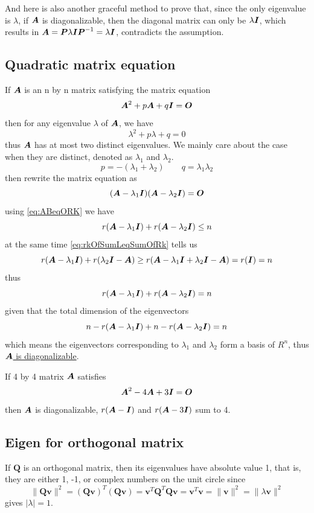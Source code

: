 \documentclass{overview}
\begin{document}
And here is also another graceful method to prove that, since the only eigenvalue
is $\lambda$, if $\boldsymbol{A}$ is diagonalizable, then the diagonal matrix can only be
$\lambda \boldsymbol{I}$, which results in $\boldsymbol{A} = \boldsymbol{P} \lambda \boldsymbol{I} \boldsymbol{P}^{-1} = \lambda \boldsymbol{I}$, contradicts the assumption.

\subsection{Quadratic matrix equation}

If $\boldsymbol{A}$ is an n by n matrix satisfying the matrix equation
\[
	\boldsymbol{A}^{2} + p\boldsymbol{A} + q\boldsymbol{I} = \boldsymbol{O}
\] 
then for any eigenvalue $\lambda$ of $\boldsymbol{A}$, we have
\[
	\lambda^{2} + p\lambda + q = 0
\]
thus $\boldsymbol{A}$ has at most two distinct eigenvalues. We mainly care about the case
when they are distinct, denoted as $\lambda_1$ and $\lambda_2$.
\[
p=-(\lambda_1 + \lambda_2) \quad  \quad q=\lambda_1 \lambda_2
\] 
then rewrite the matrix equation as
\[
	(\boldsymbol{A} - \lambda_1 \boldsymbol{I})(\boldsymbol{A} - \lambda_2 \boldsymbol{I}) = \boldsymbol{O}
\]
using \eqref{eq:ABeqORK} we have
\[
	r(\boldsymbol{A} - \lambda_1 \boldsymbol{I}) + r(\boldsymbol{A} - \lambda_2 \boldsymbol{I}) \leq n
\] 
at the same time \eqref{eq:rkOfSumLeqSumOfRk} tells us
\[
	r(\boldsymbol{A} - \lambda_1 \boldsymbol{I})+r(\lambda_2 \boldsymbol{I} - \boldsymbol{A}) \geq 
	r(\boldsymbol{A} - \lambda_1\boldsymbol{I} + \lambda_2 \boldsymbol{I} - \boldsymbol{A}) = r(\boldsymbol{I}) = n
\] 
thus
\begin{equation}
	r(\boldsymbol{A} - \lambda_1 \boldsymbol{I}) + r(\boldsymbol{A} - \lambda_2 \boldsymbol{I}) = n
\end{equation}
given that the total dimension of the eigenvectors
\[
 	n-r(\boldsymbol{A} - \lambda_1 \boldsymbol{I}) + n - r(\boldsymbol{A} - \lambda_2 \boldsymbol{I}) = n
\] 
which means the eigenvectors corresponding to $\lambda_1$ and $\lambda_2$
form a basis of $R^{n}$, thus \underline{$\boldsymbol{A}$ is diagonalizable}.

\begin{example}
If 4 by 4 matrix $\boldsymbol{A}$ satisfies
\[
	\boldsymbol{A}^{2} - 4\boldsymbol{A} + 3\boldsymbol{I} = \boldsymbol{O}
\] 
then $\boldsymbol{A}$ is diagonalizable, $r(\boldsymbol{A} - \boldsymbol{I})$ and $r(\boldsymbol{A} - 3\boldsymbol{I})$ sum to 4.
\end{example}

\subsection{Eigen for orthogonal matrix}

If $\boldsymbol{Q}$ is an orthogonal matrix, then its eigenvalues have absolute value 1,
that is, they are either 1, -1, or complex numbers on the unit circle since
\[
	\|\boldsymbol{Q}\boldsymbol{v}\|^{2} = (\boldsymbol{Q}\boldsymbol{v})^{T}(\boldsymbol{Q}\boldsymbol{v})
	= \boldsymbol{v}^{T}\boldsymbol{Q}^{T}\boldsymbol{Q}\boldsymbol{v}
	= \boldsymbol{v}^{T}\boldsymbol{v} = \|\boldsymbol{v}\|^{2}
	= \|\lambda\boldsymbol{v}\|^{2}
\] 
gives $|\lambda|=1$.
\end{document}
